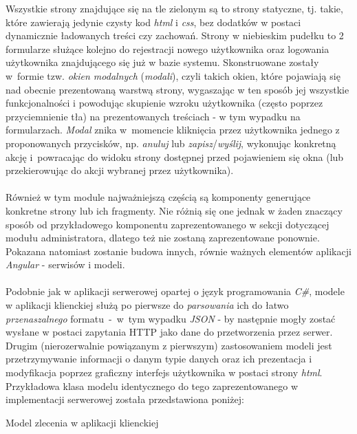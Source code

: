 \noindent Wszystkie strony znajdujące się na tle zielonym są to strony statyczne, tj. takie, które zawierają jedynie czysty kod \textit{html} i \textit{css}, bez dodatków w postaci dynamicznie ładowanych treści czy zachowań. Strony w niebieskim pudełku to 2 formularze służące kolejno do rejestracji nowego użytkownika oraz logowania użytkownika znajdującego się już w bazie systemu. Skonstruowane zostały w~formie tzw. \textit{okien modalnych } (\textit{modali}), czyli takich okien, które pojawiają się nad obecnie prezentowaną warstwą strony, wygaszając w ten sposób jej wszystkie funkcjonalności i powodując skupienie wzroku użytkownika (często poprzez przyciemnienie tła) na prezentowanych treściach - w tym wypadku na formularzach. \textit{Modal} znika w~momencie kliknięcia przez użytkownika jednego z proponowanych przycisków, np. \textit{anuluj} lub \textit{zapisz}/\textit{wyślij}, wykonując konkretną akcję i~powracając do widoku strony dostępnej przed pojawieniem się okna (lub przekierowując do akcji wybranej przez użytkownika).\\
\\
Również w tym module najważniejszą częścią są komponenty generujące konkretne strony lub ich fragmenty. Nie różnią się one jednak w żaden znaczący sposób od przykładowego komponentu zaprezentowanego w sekcji dotyczącej modułu administratora, dlatego też nie zostaną zaprezentowane ponownie. Pokazana natomiast zostanie budowa innych, równie ważnych elementów aplikacji \textit{Angular} - serwisów i modeli. \\
\\
Podobnie jak w aplikacji serwerowej opartej o język programowania \textit{C\#}, modele w aplikacji klienckiej służą po pierwsze do \textit{parsowania} ich do łatwo \textit{przenaszalnego} formatu~-~w~tym wypadku \textit{JSON} - by następnie mogły zostać wysłane w postaci zapytania HTTP jako dane do przetworzenia przez serwer. Drugim (nierozerwalnie powiązanym z pierwszym) zastosowaniem modeli jest przetrzymywanie informacji o danym typie danych oraz ich prezentacja i modyfikacja poprzez graficzny interfejs użytkownika w postaci strony \textit{html}. 
Przykładowa klasa modelu identycznego do tego zaprezentowanego w implementacji serwerowej została przedstawiona poniżej:

\begin{listing}[ht]
    \caption{Model zlecenia w aplikacji klienckiej}
    \label{listing:model-client}
\end{listing}

